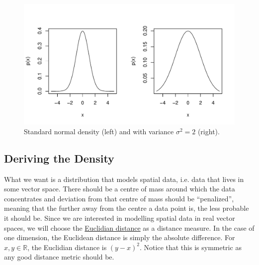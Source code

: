 \begin{figure}
\center
\begin{knitrout}
\color{fgcolor}
\includegraphics[width=\maxwidth]{figures/uniGauss-1} 

\end{knitrout}
\caption{Standard normal density (left) and with variance $ \sigma^{2} = 2 $ (right).}
\label{fig:uniGauss}
\end{figure}

\subsection{Deriving the Density}

What we want is a distribution that models spatial data, i.e. data that lives in some vector space. There should be a centre of mass around which the data concentrates
and deviation from that centre of mass should be ``penalized'', meaning that the further away from the centre a data point is, the less probable it should be.
Since we are interested in modelling spatial data in real vector spaces, we will choose the \href{https://en.wikipedia.org/wiki/Euclidean_distance}{Euclidian
distance} as a distance measure. In the case of one dimension, the Euclidean distance is simply the absolute difference. For $ x,y \in \mathbb{R} $, the Euclidian
distance is $ (y - x)^{2} $. Notice that this is symmetric as any good distance metric should be. 

